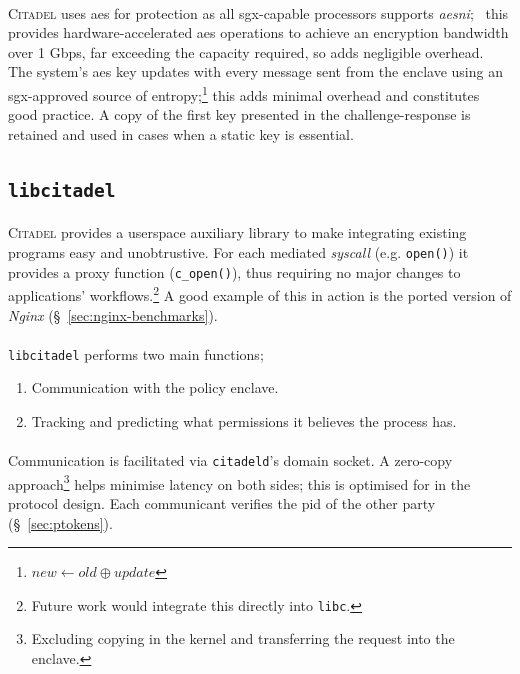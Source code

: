 \paragraph{} \textsc{Citadel} uses \acrshort{aes} for protection as all \acrshort{sgx}-capable processors supports \textit{\acrshort{aesni}};~\cite{aesni} this provides hardware-accelerated \acrshort{aes} operations to achieve an encryption bandwidth over 1 Gbps, far exceeding the capacity required, so adds negligible overhead. The system's \acrshort{aes} key updates with every message sent from the enclave using an \acrshort{sgx}-approved source of entropy;\footnote{$new \leftarrow old \oplus update$} this adds minimal overhead and constitutes good practice. A copy of the first key presented in the challenge-response is retained and used in cases when a static key is essential.

\subsection{\texttt{libcitadel}}
\label{sec:libcitadel}
\paragraph{} \textsc{Citadel} provides a userspace auxiliary library to make integrating existing programs easy and unobtrustive. For each mediated \textit{syscall} (e.g. \texttt{open()}) it provides a proxy function (\texttt{c\_open()}), thus requiring no major changes to applications' workflows.\footnote{Future work would integrate this directly into \texttt{libc}.} A good example of this in action is the ported version of \textit{Nginx} (§~\ref{sec:nginx-benchmarks}).

\paragraph{} \texttt{libcitadel} performs two main functions;
\begin{enumerate}
    \item Communication with the policy enclave.
    \item Tracking and predicting what permissions it believes the process has.
\end{enumerate}

\paragraph{} Communication is facilitated via \texttt{citadeld}'s domain socket. A zero-copy approach\footnote{Excluding copying in the kernel and transferring the request into the enclave.} helps minimise latency on both sides; this is optimised for in the protocol design. Each communicant verifies the \acrshort{pid} of the other party (§~\ref{sec:ptokens}).

